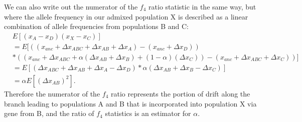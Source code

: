 \documentclass[12pt]{report}
\begin{document}
We can also write out the numerator of the $f_4$ ratio statistic in the same way, but where the allele frequency in our admixed population X is described as a linear combination of allele frequencies from populations B and C:
\begin{align*}
&E[(x_A - x_D)(x_X - x_C)] \\
&= E[((x_{anc} + \Delta{x_{ABC}} + \Delta{x_{AB}} + \Delta{x_{A}}) - (x_{anc} + \Delta{x_{D}})) \\
&*((x_{anc} + \Delta{x_{ABC}} + \alpha(\Delta{x_{AB}} + \Delta{x_B}) + (1 - \alpha)(\Delta{x_C})) - (x_{anc} + \Delta{x_{ABC}} + \Delta{x_C}))] \\
&=E[(\Delta{x_{ABC}} + \Delta{x_{AB}} + \Delta{x_{A}} - \Delta{x_{D}})*\alpha(\Delta{x_{AB}} + \Delta{x_B} - \Delta{x_C})]\\
&=\alpha E[(\Delta{x_{AB}})^2].
\end{align*}
Therefore the numerator of the $f_4$ ratio represents the portion of drift along the branch leading to populations A and B that is incorporated into population X via gene from B, and the ratio of $f_4$ statistics is an estimator for $\alpha$.
\end{document}
